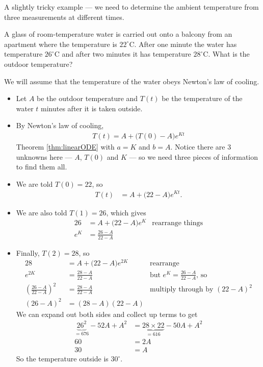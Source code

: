 A slightly tricky example --- we need to determine the ambient temperature from
three
measurements at different times.
\begin{eg}\label{eg:SDEcoolingB}
A glass of room-temperature water is carried out onto a balcony from an
apartment where the temperature is $22^\circ$C. After one minute the water has
temperature $26^\circ$C and after two minutes it has temperature $28^\circ$C.
What is the outdoor temperature?

 \soln We will assume that the temperature of the water obeys Newton's law of
 cooling.
 \begin{itemize}
 \item Let $A$ be the outdoor temperature and $T(t)$ be the temperature of the
 water $t$ minutes after it is taken outside.

 \item By Newton's law of cooling,
 \begin{align*}
 T(t)=A+\big(T(0)-A\big)e^{Kt}
 \end{align*}
 Theorem \ref{thm:linearODE} with $a=K$ and $b=A$.
Notice there are 3 unknowns here --- $A$, $T(0)$ and $K$ --- so we
need three pieces of information to find them all.

 \item We are told $T(0)=22$, so
 \begin{align*}
   T(t) &=A+\big(22-A\big)e^{Kt}.
 \end{align*}
 \item We are also told $T(1)=26$, which gives
 \begin{align*}
   26 &=A+\big(22-A\big)e^{K} & \text{rearrange things}\\
   e^K&=\frac{26-A}{22-A}
 \end{align*}
 \item Finally, $T(2)=28$, so
 \begin{align*}
 28&=A+\big(22-A\big)e^{2K} & \text{rearrange}\\
 e^{2K} &= \frac{28-A}{22-A} & \text{but $e^K=\frac{26-A}{22-A}$, so}\\
 \left(\frac{26-A}{22-A}\right)^2 &=\frac{28-A}{22-A}
         & \text{multiply through by  $(22-A)^2$}\\
 (26-A)^2 &= (28-A)(22-A)
 \end{align*}
 We can expand out both sides and collect up terms to get
 \begin{align*}
 \underbrace{26^2}_{=676}-52A+A^2 &= \underbrace{28\times22}_{=616}-50A+A^2 \\
  60 &= 2A \\
   30 &= A
 \end{align*}
 So the temperature outside is $30^\circ$.
 \end{itemize}
\end{eg}


